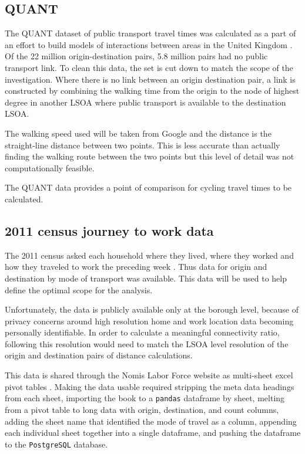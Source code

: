 \subsection{QUANT}

The QUANT dataset of public transport travel times was calculated as a part of an effort to build models of interactions between areas in the United Kingdom \parencite{quant}. Of the 22 million origin-destination pairs, 5.8 million pairs had no public transport link. To clean this data, the set is cut down to match the scope of the investigation. Where there is no link between an origin destination pair, a link is constructed by combining the walking time from the origin to the node of highest degree in another LSOA where public transport is available to the destination LSOA. 

The walking speed used will be taken from Google and the distance is the straight-line distance between two points. This is less accurate than actually finding the walking route between the two points but this level of detail was not computationally feasible. 

The QUANT data provides a point of comparison for cycling travel times to be calculated. 

\subsection{2011 census journey to work data}

The 2011 census asked each household where they lived, where they worked and how they traveled to work the preceding week \parencite{jtw}. Thus data for origin and destination by mode of transport was available. This data will be used to help define the optimal scope for the analysis. 

Unfortunately, the data is publicly available only at the borough level, because of privacy concerns around high resolution home and work location data becoming personally identifiable. In order to calculate a meaningful connectivity ratio, following \cite{furth2016network} this resolution would need to match the LSOA level resolution of the origin and destination pairs of distance calculations.  


This data is shared through the Nomis Labor Force website as multi-sheet excel pivot tables \parencite{nomis}. Making the data usable required stripping the meta data headings from each sheet, importing the book to a \texttt{pandas} dataframe by sheet, melting from a pivot table to long data with origin, destination, and count columns, adding the sheet name that identified the mode of travel as a column, appending each individual sheet together into a single dataframe, and pushing the dataframe to the \texttt{PostgreSQL} database. 

